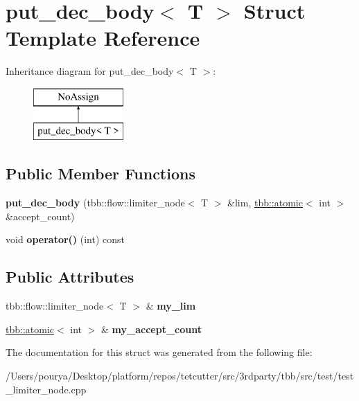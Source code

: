 \hypertarget{structput__dec__body}{}\section{put\+\_\+dec\+\_\+body$<$ T $>$ Struct Template Reference}
\label{structput__dec__body}
Inheritance diagram for put\+\_\+dec\+\_\+body$<$ T $>$\+:\begin{figure}[H]
\begin{center}
\leavevmode
\includegraphics[height=2.000000cm]{structput__dec__body}
\end{center}
\end{figure}
\subsection*{Public Member Functions}
\begin{DoxyCompactItemize}
\item 
\hypertarget{structput__dec__body_a92b4d003b9a50227992e892fdd88e753}{}{\bfseries put\+\_\+dec\+\_\+body} (tbb\+::flow\+::limiter\+\_\+node$<$ T $>$ \&lim, \hyperlink{structtbb_1_1atomic}{tbb\+::atomic}$<$ int $>$ \&accept\+\_\+count)\label{structput__dec__body_a92b4d003b9a50227992e892fdd88e753}

\item 
\hypertarget{structput__dec__body_a6467baf1698cabe7b6e3d2e04f89263c}{}void {\bfseries operator()} (int) const \label{structput__dec__body_a6467baf1698cabe7b6e3d2e04f89263c}

\end{DoxyCompactItemize}
\subsection*{Public Attributes}
\begin{DoxyCompactItemize}
\item 
\hypertarget{structput__dec__body_a4df9e12965436d2f9f04a8665c13c35e}{}tbb\+::flow\+::limiter\+\_\+node$<$ T $>$ \& {\bfseries my\+\_\+lim}\label{structput__dec__body_a4df9e12965436d2f9f04a8665c13c35e}

\item 
\hypertarget{structput__dec__body_a7a731b2ceb473cb984d43bf2d5d26163}{}\hyperlink{structtbb_1_1atomic}{tbb\+::atomic}$<$ int $>$ \& {\bfseries my\+\_\+accept\+\_\+count}\label{structput__dec__body_a7a731b2ceb473cb984d43bf2d5d26163}

\end{DoxyCompactItemize}


The documentation for this struct was generated from the following file\+:\begin{DoxyCompactItemize}
\item 
/\+Users/pourya/\+Desktop/platform/repos/tetcutter/src/3rdparty/tbb/src/test/test\+\_\+limiter\+\_\+node.\+cpp\end{DoxyCompactItemize}
